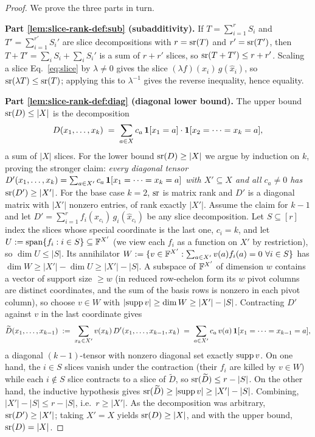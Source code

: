 \begin{proof}
We prove the three parts in turn.

\smallskip\noindent
\textbf{Part \ref{lem:slice-rank-def:sub} (subadditivity).}
If $T=\sum_{i=1}^{r}S_i$ and $T'=\sum_{i=1}^{r'}S_i'$ are slice decompositions with
$r=\operatorname{sr}(T)$ and $r'=\operatorname{sr}(T')$, then $T+T'=\sum_i S_i+\sum_i S_i'$ is a sum of $r+r'$
slices, so $\operatorname{sr}(T+T')\le r+r'$. Scaling a slice Eq.~\eqref{eq:slice} by $\lambda\ne 0$
gives the slice $(\lambda f)(x_i)\,g(\widehat{x}_i)$, so $\operatorname{sr}(\lambda T)\le\operatorname{sr}(T)$;
applying this to $\lambda^{-1}$ gives the reverse inequality, hence equality.

\smallskip\noindent
\textbf{Part \ref{lem:slice-rank-def:diag} (diagonal lower bound).}
The upper bound $\operatorname{sr}(D)\le|X|$ is the decomposition
\begin{align*}
D(x_1,\dots,x_k)\;=\;\sum_{a\in X}c_a\,\mathbf{1}[x_1=a]\cdot\mathbf{1}[x_2=\dots=x_k=a],
\end{align*}
a sum of $|X|$ slices. For the lower bound $\operatorname{sr}(D)\ge|X|$ we argue by induction on
$k$, proving the stronger claim: \emph{every diagonal tensor
$D'(x_1,\dots,x_k)=\sum_{a\in X'}c_a\,\mathbf{1}[x_1=\dots=x_k=a]$ with $X'\subseteq X$ and
all $c_a\ne 0$ has $\operatorname{sr}(D')\ge|X'|$.} For the base case $k=2$, $\operatorname{sr}$ is matrix rank
and $D'$ is a diagonal matrix with $|X'|$ nonzero entries, of rank exactly $|X'|$.
Assume the claim for $k-1$ and let
$D'=\sum_{i=1}^{r}f_i(x_{c_i})\,g_i(\widehat{x}_{c_i})$ be any slice decomposition.
Let $S\subseteq[r]$ index the slices whose special coordinate is the last one,
$c_i=k$, and let $U:=\operatorname{span}\{f_i:i\in S\}\subseteq\mathbb{F}^{X'}$ (we view each $f_i$ as a
function on $X'$ by restriction), so $\dim U\le|S|$. Its annihilator
$W:=\{v\in\mathbb{F}^{X'}:\sum_{a\in X'}v(a)f_i(a)=0\ \forall i\in S\}$ has
$\dim W\ge|X'|-\dim U\ge|X'|-|S|$. A subspace of $\mathbb{F}^{X'}$ of dimension $w$ contains
a vector of support size $\ge w$ (in reduced row-echelon form its $w$ pivot columns
are distinct coordinates, and the sum of the basis rows is nonzero in each pivot
column), so choose $v\in W$ with $|\!\operatorname{supp} v|\ge\dim W\ge|X'|-|S|$. Contracting $D'$
against $v$ in the last coordinate gives
\begin{align*}
\widetilde{D}(x_1,\dots,x_{k-1})
\;:=\;\sum_{x_k\in X'}v(x_k)\,D'(x_1,\dots,x_{k-1},x_k)
\;=\;\sum_{a\in X'}c_a\,v(a)\,\mathbf{1}[x_1=\dots=x_{k-1}=a],
\end{align*}
a diagonal $(k-1)$-tensor with nonzero diagonal set exactly $\operatorname{supp} v$. On one hand,
the $i\in S$ slices vanish under the contraction (their $f_i$ are killed by $v\in W$)
while each $i\notin S$ slice contracts to a slice of $\widetilde{D}$, so
$\operatorname{sr}(\widetilde{D})\le r-|S|$. On the other hand, the inductive hypothesis gives
$\operatorname{sr}(\widetilde{D})\ge|\!\operatorname{supp} v|\ge|X'|-|S|$. Combining,
$|X'|-|S|\le r-|S|$, i.e.\ $r\ge|X'|$. As the decomposition was arbitrary,
$\operatorname{sr}(D')\ge|X'|$; taking $X'=X$ yields $\operatorname{sr}(D)\ge|X|$, and with the upper bound,
$\operatorname{sr}(D)=|X|$.


\end{proof}
